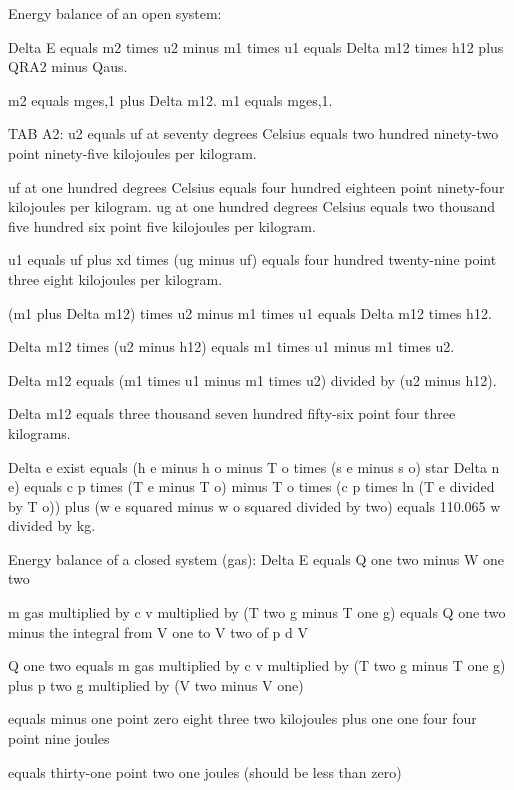 Energy balance of an open system:

Delta E equals m2 times u2 minus m1 times u1 equals Delta m12 times h12 plus QRA2 minus Qaus.

m2 equals mges,1 plus Delta m12. m1 equals mges,1.

TAB A2: u2 equals uf at seventy degrees Celsius equals two hundred ninety-two point ninety-five kilojoules per kilogram.

uf at one hundred degrees Celsius equals four hundred eighteen point ninety-four kilojoules per kilogram. ug at one hundred degrees Celsius equals two thousand five hundred six point five kilojoules per kilogram.

u1 equals uf plus xd times (ug minus uf) equals four hundred twenty-nine point three eight kilojoules per kilogram.

(m1 plus Delta m12) times u2 minus m1 times u1 equals Delta m12 times h12.

Delta m12 times (u2 minus h12) equals m1 times u1 minus m1 times u2.

Delta m12 equals (m1 times u1 minus m1 times u2) divided by (u2 minus h12).

Delta m12 equals three thousand seven hundred fifty-six point four three kilograms.

Delta e exist equals (h e minus h o minus T o times (s e minus s o) star Delta n e) equals c p times (T e minus T o) minus T o times (c p times ln (T e divided by T o)) plus (w e squared minus w o squared divided by two) equals 110.065 w divided by kg.

Energy balance of a closed system (gas):  
Delta E equals Q one two minus W one two  

m gas multiplied by c v multiplied by (T two g minus T one g) equals Q one two minus the integral from V one to V two of p d V  

Q one two equals m gas multiplied by c v multiplied by (T two g minus T one g) plus p two g multiplied by (V two minus V one)  

equals minus one point zero eight three two kilojoules plus one one four four point nine joules  

equals thirty-one point two one joules (should be less than zero)